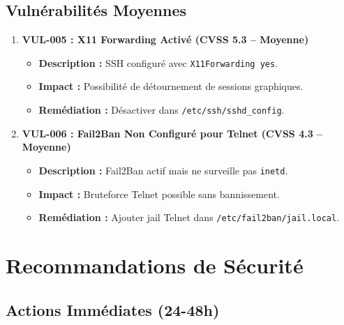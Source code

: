\documentclass[12pt,a4paper,openany]{report}
\begin{document}
	\subsection{Vulnérabilités Moyennes}
	
	\begin{enumerate}
		\item \textbf{VUL-005 : X11 Forwarding Activé (CVSS 5.3 -- Moyenne)}
		\begin{itemize}
			\item \textbf{Description :} SSH configuré avec \texttt{X11Forwarding yes}.
			\item \textbf{Impact :} Possibilité de détournement de sessions graphiques.
			\item \textbf{Remédiation :} Désactiver dans \texttt{/etc/ssh/sshd\_config}.
		\end{itemize}
		
		\item \textbf{VUL-006 : Fail2Ban Non Configuré pour Telnet (CVSS 4.3 -- Moyenne)}
		\begin{itemize}
			\item \textbf{Description :} Fail2Ban actif mais ne surveille pas \texttt{inetd}.
			\item \textbf{Impact :} Bruteforce Telnet possible sans bannissement.
			\item \textbf{Remédiation :} Ajouter jail Telnet dans \texttt{/etc/fail2ban/jail.local}.
		\end{itemize}
	\end{enumerate}
	
	\section{Recommandations de Sécurité}
	
	\subsection{Actions Immédiates (24-48h)}
	
\end{document}
